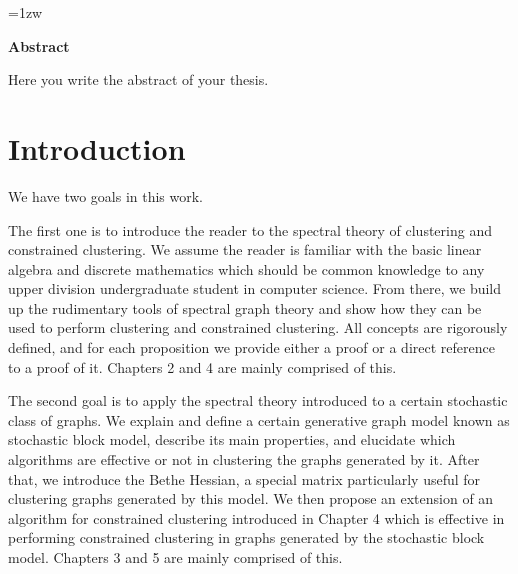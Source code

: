 \maketitle
\thispagestyle{empty}
\newpage

\thispagestyle{empty}
\vspace*{20pt plus 1fil}
\parindent=1zw
\noindent
\begin{center}
{\Large \bf Abstract}
\vspace{2cm}
\end{center}
Here you write the abstract of your thesis.

\par
\vspace{0pt plus 1fil}
\newpage

\tableofcontents
\listoffigures

\pagebreak \setcounter{page}{1}


\chapter{Introduction}
We have two goals in this work.

The first one is to introduce the reader to the spectral theory of clustering and constrained clustering.
We assume the reader is familiar with the basic linear algebra and discrete mathematics which should be common knowledge to any upper division undergraduate student in computer science.
From there, we build up the rudimentary tools of spectral graph theory and show how they can be used to perform clustering and constrained clustering.
All concepts are rigorously defined, and for each proposition we provide either a proof or a direct reference to a proof of it.
Chapters 2 and 4 are mainly comprised of this.

The second goal is to apply the spectral theory introduced to a certain stochastic class of graphs. We explain and define a certain generative graph model known as stochastic block model, describe its main properties, and elucidate which algorithms are effective or not in clustering the graphs generated by it.
After that, we introduce the Bethe Hessian, a special matrix particularly useful for clustering graphs generated by this model.
We then propose an extension of an algorithm for constrained clustering introduced in Chapter 4 which is effective in performing constrained clustering in graphs generated by the stochastic block model.
Chapters 3 and 5 are mainly comprised of this.

